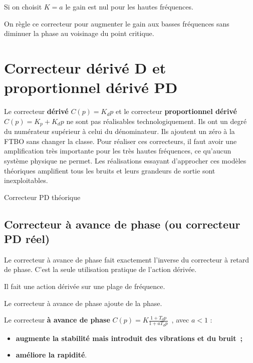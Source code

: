 Si on choisit \(K = a\) le gain est nul pour les hautes fréquences.

On règle ce correcteur pour augmenter le gain aux basses fréquences sans diminuer la phase au voisinage du point critique.

\hypertarget{correcteur-duxe9rivuxe9-d-et-proportionnel-duxe9rivuxe9-pd}{%
\section{Correcteur dérivé D et proportionnel dérivé PD}\label{correcteur-duxe9rivuxe9-d-et-proportionnel-duxe9rivuxe9-pd}}

Le correcteur \textbf{dérivé} \(C(p) = K_{d}p\) et le correcteur \textbf{proportionnel dérivé} \(C(p) = K_{p} + K_{d}p\) ne sont pas réalisables technologiquement. Ils ont un degré du numérateur supérieur à celui du dénominateur. Ils ajoutent un zéro à la FTBO sans changer la classe. Pour réaliser ces correcteurs, il faut avoir une amplification très importante pour les très hautes fréquences, ce qu'aucun système physique ne permet. Les réalisations essayant d'approcher ces modèles théoriques amplifient tous les bruits et leurs grandeurs de sortie sont inexploitables.

Correcteur PD théorique

\hypertarget{correcteur-uxe0-avance-de-phase-ou-correcteur-pd-ruxe9el}{%
\subsection{Correcteur à avance de phase (ou correcteur PD réel)}\label{correcteur-uxe0-avance-de-phase-ou-correcteur-pd-ruxe9el}}

\TLBodeAvancePhase[1][0.1][1]


Le correcteur à avance de phase fait exactement l'inverse du correcteur à retard de phase. C'est la seule utilisation pratique de l'action dérivée.

Il fait une action dérivée sur une plage de fréquence.

Le correcteur à avance de phase ajoute de la phase.

Le correcteur \textbf{à avance de phase} \(C(p) = K\frac{1 + T_{d}p}{1 + aT_{d}p}\)~, avec \(a < 1\) :

\begin{itemize}
\item
  \textbf{augmente la stabilité mais introduit des vibrations et du bruit~;}
\item
  \textbf{améliore la rapidité}.
\end{itemize}

